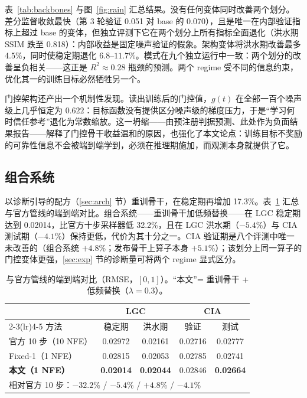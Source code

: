 \documentclass{article}
\begin{document}
表~\ref{tab:backbones} 与图~\ref{fig:rain} 汇总结果。没有任何变体同时改善两个划分。差分监督收敛最快（第 3 轮验证 0.051 对 base 的 0.070），且是唯一在内部验证指标上超过 base 的变体，但独立评测下它在两个划分上所有指标全面退化（洪水期 SSIM 跌至 0.818）：内部收益是固定噪声验证的假象。架构变体将洪水期改善最多 $4.5$\%，同时使稳定期退化 $6.8$--$11.7$\%。模式在九个独立运行中一致：两个划分的改善呈负相关——这正是 $R^2\approx0.28$ 瓶颈的预测。两个 regime 受不同的信息约束，优化其一的训练目标必然牺牲另一个。

门控架构还产出一个机制性发现。读出训练后的门控值，$g(t)$ 在全部一百个噪声级上几乎恒定为 $0.622$：目标函数没有提供区分噪声级的梯度压力，于是“学习何时信任参考”退化为常数缩放。这一坍缩——由预注册判据预测、此处作为负面结果报告——解释了门控骨干收益温和的原因，也强化了本文论点：训练目标不奖励的可靠性信息不会被端到端学到，必须在推理期施加，而观测本身就提供了它。

\subsection{组合系统}
\label{sec:combined}
以诊断引导的配方（\ref{sec:arch} 节）重训骨干，在稳定期再增加 17.3\%。表~\ref{tab:system} 汇总与官方管线的端到端对比。组合系统——重训骨干加低频替换——在 LGC 稳定期达到 0.02014，比官方十步采样器低 32.2\%，且在 LGC 洪水期（$-5.4$\%）与 CIA 测试期（$-4.1$\%）保持更低，代价为其十分之一。CIA 验证期是八个评测中唯一未改善的（组合系统 $+4.8$\%；发布骨干上算子本身 $+5.1$\%）；该划分上同一算子的门控变体更强，\ref{sec:exp} 节的诊断量可将两个 regime 显式区分。

\begin{table}[t]
\centering
\caption{与官方管线的端到端对比（RMSE，$[0,1]$）。``本文''= 重训骨干 + 低频替换（$\lambda{=}0.3$）。}
\label{tab:system}
\begin{tabular}{lcccc}
\toprule
 & \multicolumn{2}{c}{LGC} & \multicolumn{2}{c}{CIA} \\
\cmidrule(lr){2-3}\cmidrule(lr){4-5}
方法 & 稳定期 & 洪水期 & 验证 & 测试 \\
\midrule
官方 10 步（10 NFE） & 0.02972 & 0.02161 & 0.02716 & 0.02777 \\
Fixed-1（1 NFE） & 0.02815 & 0.02053 & 0.02785 & 0.02741 \\
\textbf{本文（1 NFE）} & \textbf{0.02014} & \textbf{0.02044} & 0.02846 & \textbf{0.02664} \\
\midrule
\multicolumn{5}{l}{\footnotesize 相对官方 10 步：$-32.2$\% / $-5.4$\% / $+4.8$\% / $-4.1$\%} \\
\bottomrule
\end{tabular}
\end{table}
\end{document}
